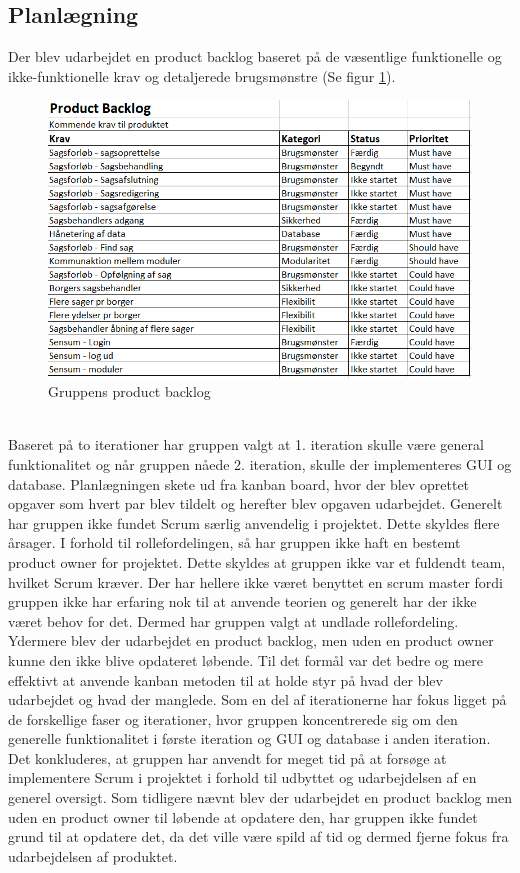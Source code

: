\subsection{Planlægning} \label{plan}
Der blev udarbejdet en product backlog baseret på de væsentlige funktionelle og ikke-funktionelle krav og detaljerede brugsmønstre (Se figur \ref{fig:productbacklog}).
\begin{figure}[hbt!]
  \includegraphics[width = \linewidth]{./PNG/Metoder/product_backlog.png}
  \caption{Gruppens product backlog}
  \label{fig:productbacklog}
\end{figure}
\\Baseret på to iterationer har gruppen valgt at 1. iteration skulle være general funktionalitet og når gruppen nåede 2. iteration, skulle der implementeres GUI og database. 
Planlægningen skete ud fra kanban board, hvor der blev oprettet opgaver som hvert par blev tildelt og herefter blev opgaven udarbejdet. 
Generelt har gruppen ikke fundet Scrum særlig anvendelig i projektet. 
Dette skyldes flere årsager. 
I forhold til rollefordelingen, så har gruppen ikke haft en bestemt product owner for projektet. 
Dette skyldes at gruppen ikke var et fuldendt team, hvilket Scrum kræver. 
Der har hellere ikke været benyttet en scrum master fordi gruppen ikke har erfaring nok til at anvende teorien og generelt har der ikke været behov for det. 
Dermed har gruppen valgt at undlade rollefordeling. 
Ydermere blev der udarbejdet en product backlog, men uden en product owner kunne den ikke blive opdateret løbende. 
Til det formål var det bedre og mere effektivt at anvende kanban metoden til at holde styr på hvad der blev udarbejdet og hvad der manglede. 
Som en del af iterationerne har fokus ligget på de forskellige faser og iterationer, hvor gruppen koncentrerede sig om den generelle funktionalitet i første iteration og GUI og database i anden iteration. Det konkluderes, at gruppen har anvendt for meget tid på at forsøge at implementere Scrum i projektet i forhold til udbyttet og udarbejdelsen af en generel oversigt. Som tidligere nævnt blev der udarbejdet en product backlog men uden en product owner til løbende at opdatere den, har gruppen ikke fundet grund til at opdatere det, da det ville være spild af tid og dermed fjerne fokus fra udarbejdelsen af produktet.
